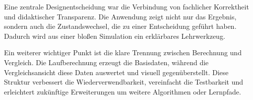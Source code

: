 Eine zentrale Designentscheidung war die Verbindung von fachlicher Korrektheit und didaktischer Transparenz. Die Anwendung zeigt nicht nur das Ergebnis, sondern auch die Zustandswechsel, die zu einer Entscheidung geführt haben. Dadurch wird aus einer bloßen Simulation ein erklärbares Lehrwerkzeug.

Ein weiterer wichtiger Punkt ist die klare Trennung zwischen Berechnung und Vergleich. Die Laufberechnung erzeugt die Basisdaten, während die Vergleichsansicht diese Daten auswertet und visuell gegenüberstellt. Diese Struktur verbessert die Wiederverwendbarkeit, vereinfacht die Testbarkeit und erleichtert zukünftige Erweiterungen um weitere Algorithmen oder Lernpfade.
